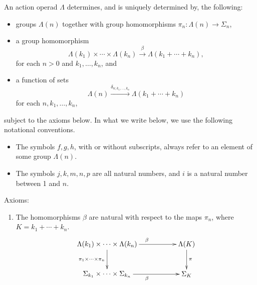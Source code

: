 \begin{thm}\label{thm:charAOp}
An action operad $\Lambda$ determines, and is uniquely determined by, the following: 
\begin{itemize}
\item groups $\Lambda(n)$ together with group homomorphisms $\pi_{n} \colon \Lambda(n) \rightarrow \Sigma_{n}$,
\item a group homomorphism
  \[
    \Lambda(k_{1}) \times \cdots \times \Lambda(k_{n}) \stackrel{\beta}{\longrightarrow} \Lambda(k_{1} + \cdots + k_{n}),
  \]
for each $n > 0$ and $k_{1}, \ldots, k_{n}$, and
\item a function of sets
  \[
    \Lambda(n) \stackrel{\delta_{n; k_{1}, \ldots, k_{n}}}{\longrightarrow} \Lambda(k_{1} + \cdots + k_{n})
  \]
for each $n, k_{1}, \ldots, k_{n}$,
\end{itemize}
subject to the axioms below. In what we write below, we use the following notational conventions.
\begin{itemize}
\item The symbols $f,g,h$, with or without subscripts, always refer to an element of some group $\Lambda(n)$.
\item The symbols $j,k,m,n,p$ are all natural numbers, and $i$ is a natural number between 1 and $n$.
\end{itemize}
Axioms:
\begin{enumerate}
\item\label{eq1} The homomorphisms $\beta$ are natural with respect to the maps $\pi_{n}$, where $K = k_{1} + \cdots + k_{n}$.
  \[
    \xy
      (0,0)*+{\Lambda(k_{1}) \times \cdots \times \Lambda(k_{n}) } ="00";
      (0,-15)*+{\Sigma_{k_{1}} \times \cdots \times \Sigma_{k_{n}}  } ="01";
      (40,0)*+{\Lambda(K) } ="20";
      (40,-15)*+{\Sigma_{K} } ="21";
      {\ar^{\beta} "00" ; "20"};
      {\ar^{\pi} "20" ; "21"};
      {\ar_{\pi_1 \times \cdots \times \pi_n} "00" ; "01"};
      {\ar_{\beta} "01" ; "21"};
    \endxy
  \]


\end{enumerate}
\end{thm}

